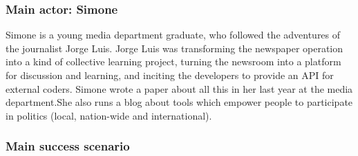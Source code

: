 \subsubsection{Main actor: Simone}

Simone is a young media department graduate, who followed the adventures
of the journalist Jorge Luis. Jorge Luis was transforming the newspaper
operation into a kind of collective learning project, turning the
newsroom into a platform for discussion and learning, and inciting the
developers to provide an API for external coders. Simone wrote a paper
about all this in her last year at the media department.\textbf{}She
also runs a blog about tools which empower people to participate in
politics (local, nation-wide and international).

\subsubsection{Main success scenario}


